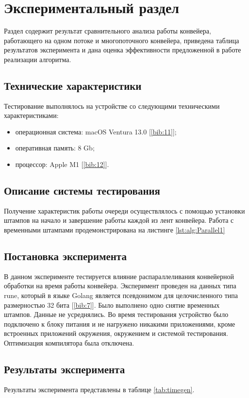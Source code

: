 \chapter{Экспериментальный раздел}
\label{cha:research}
Раздел содержит результат сравнительного анализа работы конвейера, работающего на одном потоке и многопоточного конвейера, приведена таблица результатов эксперимента и дана оценка эффективности предложенной в работе реализации алгоритма.

\section{Технические характеристики}
Тестирование выполнялось на устройстве со следующими техническими характеристиками:
\begin{itemize}
        \item операционная система: macOS Ventura 13.0 [\ref{bib:11}];
        \item оперативная память: 8 Gb;
        \item процессор: Apple M1 [\ref{bib:12}].
\end{itemize}

\section{Описание системы тестирования}
Получение характеристик работы очереди осуществлялось с помощью установки штампов на начало и завершение работы каждой из лент конвейера. Работа с временными штампами продемонстрирована на листинге \ref{lst:alg:Parallel1}

\section{Постановка эксперимента}
В данном эксперименте тестируется влияние распараллеливания конвейерной обработки на время работы конвейера. Эксперимент проведен на данных типа rune, который в языке Golang является псевдонимом для целочисленного типа размерностью 32 бита [\ref{bib:7}].
Было выполнено одно снятие временных штампов. Данные не усреднялись.
Во время тестирования устройство было подключено к блоку питания и не нагружено никакими приложениями, кроме встроенных приложений окружения, окружением и системой тестирования. Оптимизация компилятора была отключена.

\section{Результаты эксперимента}
Результаты эксперимента представлены в таблице \ref{tab:timegen}.

